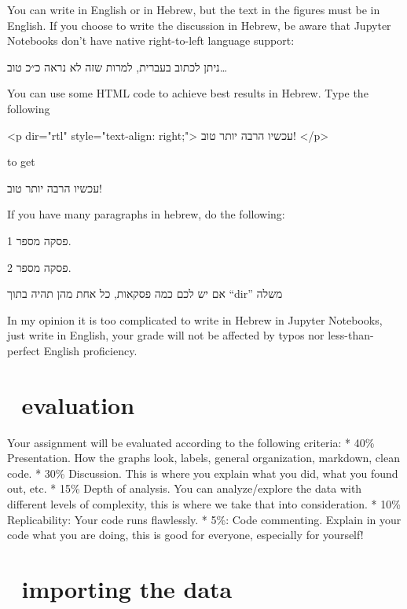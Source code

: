 \documentclass[
  letterpaper,
  DIV=11,
  numbers=noendperiod]{scrreprt}
\newenvironment{Shaded}{\begin{snugshade}}{\end{snugshade}}
\newcommand{\ErrorTok}[1]{\textcolor[rgb]{0.68,0.00,0.00}{#1}}
\newcommand{\KeywordTok}[1]{\textcolor[rgb]{0.00,0.23,0.31}{#1}}
\newcommand{\NormalTok}[1]{\textcolor[rgb]{0.00,0.23,0.31}{#1}}
\newcommand{\OtherTok}[1]{\textcolor[rgb]{0.00,0.23,0.31}{#1}}
\newcommand{\StringTok}[1]{\textcolor[rgb]{0.13,0.47,0.30}{#1}}
\begin{document}
You can write in English or in Hebrew, but the text in the figures must
be in English. If you choose to write the discussion in Hebrew, be aware
that Jupyter Notebooks don't have native right-to-left language support:

ניתן לכתוב בעברית, למרות שזה לא נראה כ״כ טוב\ldots{}

You can use some HTML code to achieve best results in Hebrew. Type the
following

\begin{Shaded}
\begin{Highlighting}[]
\KeywordTok{\textless{}p} \ErrorTok{dir}\OtherTok{=}\StringTok{"rtl"} \ErrorTok{style}\OtherTok{=}\StringTok{"text{-}align: right;"}\KeywordTok{\textgreater{}}
\NormalTok{עכשיו הרבה יותר טוב!}
\KeywordTok{\textless{}/p\textgreater{}}
\end{Highlighting}
\end{Shaded}

to get

עכשיו הרבה יותר טוב!

If you have many paragraphs in hebrew, do the following:

פסקה מספר 1.

פסקה מספר 2.

אם יש לכם כמה פסקאות, כל אחת מהן תהיה בתוך ``dir'' משלה

In my opinion it is too complicated to write in Hebrew in Jupyter
Notebooks, just write in English, your grade will not be affected by
typos nor less-than-perfect English proficiency.

\hypertarget{evaluation-1}{%
\section{💯 evaluation}\label{evaluation-1}}

Your assignment will be evaluated according to the following criteria: *
40\% Presentation. How the graphs look, labels, general organization,
markdown, clean code. * 30\% Discussion. This is where you explain what
you did, what you found out, etc. * 15\% Depth of analysis. You can
analyze/explore the data with different levels of complexity, this is
where we take that into consideration. * 10\% Replicability: Your code
runs flawlessly. * 5\%: Code commenting. Explain in your code what you
are doing, this is good for everyone, especially for yourself!

\hypertarget{importing-the-data-2}{%
\section{🚚 importing the data}\label{importing-the-data-2}}
\end{document}
